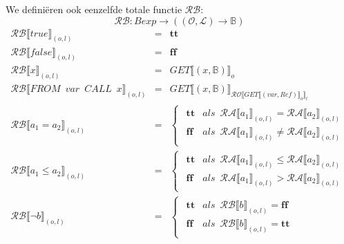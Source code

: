 \documentclass[12pt]{article}
\newcommand{\RA}{\mathcal{RA}}
\newcommand{\RB}{\mathcal{RB}}
\newcommand{\RO}{\mathcal{RO}}
\begin{document}
We definiëren ook eenzelfde totale functie $ \RB $:
\[ \RB : Bexp \rightarrow ((\mathcal{O},\mathcal{L}) \rightarrow \mathds{B} ) \]
\[
\begin{matrix}
\RB \llbracket true \rrbracket_{(o,l)} & = & \boldsymbol{tt}\\
\RB \llbracket false \rrbracket_{(o,l)} & = & \boldsymbol{ff}\\

\RB \llbracket x \rrbracket_{(o,l)} & = & GET\llbracket (x,\mathds{B}) \rrbracket_o \\

\RB \llbracket FROM \enspace var \enspace CALL \enspace x \rrbracket_{(o,l)} & = & GET\llbracket (x,\mathds{B}) \rrbracket_{\RO \llbracket GET\llbracket (var,Ref) \rrbracket_o \rrbracket_l}\\

\RB \llbracket a_1 = a_2 \rrbracket_{(o,l)} & = &
\begin{cases}
\begin{matrix}
\boldsymbol{tt} & als \enspace \RA\llbracket a_1 \rrbracket_{(o,l)} = \RA\llbracket a_2 \rrbracket_{(o,l)} \\
\boldsymbol{ff} & als \enspace \RA\llbracket a_1 \rrbracket_{(o,l)} \not= \RA\llbracket a_2 \rrbracket_{(o,l)}
\end{matrix}
\end{cases}\\

\RB \llbracket a_1 \leq a_2 \rrbracket_{(o,l)} & = &
\begin{cases}
\begin{matrix}
\boldsymbol{tt} & als \enspace \RA\llbracket a_1 \rrbracket_{(o,l)} \leq \RA\llbracket a_2 \rrbracket_{(o,l)} \\
\boldsymbol{ff} & als \enspace \RA\llbracket a_1 \rrbracket_{(o,l)} > \RA\llbracket a_2 \rrbracket_{(o,l)}
\end{matrix}
\end{cases}\\

\RB \llbracket \neg b \rrbracket_{(o,l)} & = &
\begin{cases}
\begin{matrix}
\boldsymbol{tt} & als \enspace \RB\llbracket b \rrbracket_{(o,l)} = \boldsymbol{ff} \\
\boldsymbol{ff} & als \enspace \RB\llbracket b \rrbracket_{(o,l)} = \boldsymbol{tt}
\end{matrix}
\end{cases}\\


\end{matrix}\]
\end{document}
